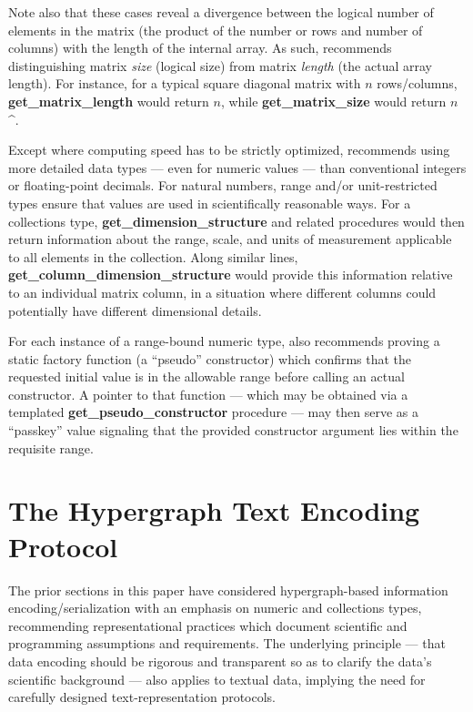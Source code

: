 \documentclass[12pt,letterpaper]{article}
\newcommand{\procitem}[1]{{#1}}
\newcommand{\dprocitem}[1]{{\color{black!60}\textbf{#1}}}
\newcommand{\HGDM}{\resizebox{!}{7.5pt}{\ATexttclr{HGDM}}}
\newcommand{\ATexttclr}[1]{\textcolor{tcolor}{\textbf{#1}}}
\newcommand{\p}[1]{

\vspace{.7em}#1}
\newcommand{\q}[1]{{\fontfamily{qcr}\selectfont ``}#1{\fontfamily{qcr}\selectfont ''}}
\begin{document}
{{\begin{description}
\descindent{}  Note also that these cases reveal a 
divergence between the logical number of elements in 
the matrix (the product of the number or rows and number 
of columns) with the length of the internal 
array.  As such, \HGDM{} recommends distinguishing 
matrix \textit{size} (logical size) from matrix 
\textit{length} (the actual array length).  For 
instance, for a typical square diagonal matrix 
with $n$ rows/columns, 
\dprocitem{get\_matrix\_length} would return 
$n$, while \dprocitem{get\_matrix\_size} would 
return $n$^{}.           

\item[\procitem{get\_dimension\_structure()}, 
\procitem{get\_column\_dimension\_structure()}, 
\procitem{get\_pseudo\_constructor()}]  Except 
where computing speed has to be strictly optimized, 
\HGDM{} recommends using more detailed data types 
--- even for numeric values --- than conventional 
integers or floating-point decimals.  
For natural numbers, range and/or unit-restricted 
types ensure that values are used in scientifically 
reasonable ways.  For a collections type, \dprocitem{get\_dimension\_structure} 
and related procedures would 
then return information about the range, scale, and     
units of measurement applicable to all elements in the 
collection.  Along similar lines, 
\dprocitem{get\_column\_dimension\_structure} would 
provide this information relative to an individual 
matrix column, in a situation where different 
columns could potentially have different dimensional details.

\descindent{}  For each instance of a range-bound numeric type, 
\HGDM{} also recommends proving a static factory function 
(a \q{pseudo} constructor) which confirms that the requested 
initial value is in the allowable range before calling 
an actual constructor.  A pointer to that function 
--- which may be obtained via a templated 
\dprocitem{get\_pseudo\_constructor} procedure --- 
may then serve as a \q{passkey} value signaling that 
the provided constructor argument lies within the requisite range. 
\end{description}
}

\section{The Hypergraph Text Encoding Protocol}
\p{The prior sections in this paper have considered 
hypergraph-based information encoding/serializ\-ation 
with an emphasis on numeric 
and collections types, recommending representational 
practices which document scientific and programming 
assumptions and requirements.  The underlying principle --- 
that data encoding should be rigorous and transparent 
so as to clarify the data's scientific background --- 
also applies to textual data, implying the need for 
carefully designed text-representation protocols.}

}
\end{document}
